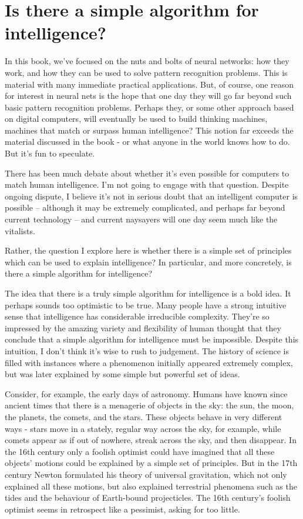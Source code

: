 \documentclass[a4paper,twoside,10pt]{book}
\begin{document}
\chapter{Is there a simple algorithm for intelligence?}
In this book, we've focused on the nuts and bolts of neural networks: how they work, and how they can be used to solve pattern recognition problems. This is material with many immediate practical applications. But, of course, one reason for interest in neural nets is the hope that one day they will go far beyond such basic pattern recognition problems. Perhaps they, or some other approach based on digital computers, will eventually be used to build thinking machines, machines that match or surpass human intelligence? This notion far exceeds the material discussed in the book - or what anyone in the world knows how to do. But it's fun to speculate.

There has been much debate about whether it's even possible for computers to match human intelligence. I'm not going to engage with that question. Despite ongoing dispute, I believe it's not in serious doubt that an intelligent computer is possible -- although it may be extremely complicated, and perhaps far beyond current technology -- and current naysayers will one day seem much like the vitalists.

Rather, the question I explore here is whether there is a simple set of principles which can be used to explain intelligence? In particular, and more concretely, is there a simple algorithm for intelligence?

The idea that there is a truly simple algorithm for intelligence is a bold idea. It perhaps sounds too optimistic to be true. Many people have a strong intuitive sense that intelligence has considerable irreducible complexity. They're so impressed by the amazing variety and flexibility of human thought that they conclude that a simple algorithm for intelligence must be impossible. Despite this intuition, I don't think it's wise to rush to judgement. The history of science is filled with instances where a phenomenon initially appeared extremely complex, but was later explained by some simple but powerful set of ideas.

Consider, for example, the early days of astronomy. Humans have known since ancient times that there is a menagerie of objects in the sky: the sun, the moon, the planets, the comets, and the stars. These objects behave in very different ways - stars move in a stately, regular way across the sky, for example, while comets appear as if out of nowhere, streak across the sky, and then disappear. In the 16th century only a foolish optimist could have imagined that all these objects' motions could be explained by a simple set of principles. But in the 17th century Newton formulated his theory of universal gravitation, which not only explained all these motions, but also explained terrestrial phenomena such as the tides and the behaviour of Earth-bound projecticles. The 16th century's foolish optimist seems in retrospect like a pessimist, asking for too little.
\end{document}
